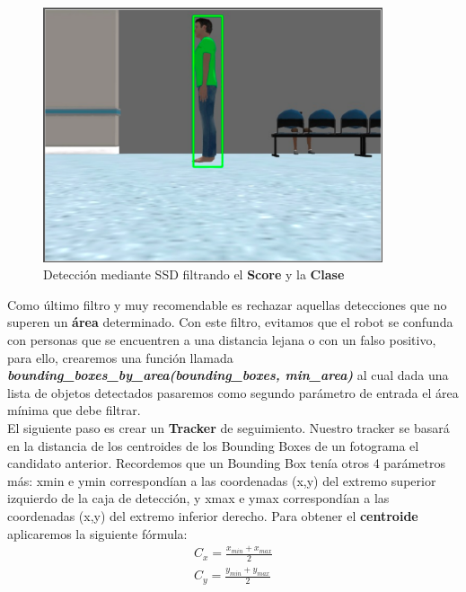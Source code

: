 \begin{figure} [H]
  \begin{center}
    \includegraphics[width=10cm]{imagenes/deteccion-ssd-filtro-score-class.png}
  \end{center}
  \caption[Detección mediante SSD filtrando el \textbf{Score} y la \textbf{Clase}]{Detección mediante SSD filtrando el \textbf{Score} y la \textbf{Clase}}
  \label{fig:deteccion_ssd_filtro_score_class}
\end{figure}

Como último filtro y muy recomendable es rechazar aquellas detecciones que no superen un \textbf{área} determinado. Con este filtro, evitamos que el robot se confunda con personas que se encuentren a una distancia lejana o con un falso positivo, para ello, crearemos una función llamada \textbf{\textit{bounding\_boxes\_by\_area(bounding\_boxes, min\_area)}} al cual dada una lista de objetos detectados pasaremos como segundo parámetro de entrada el área mínima que debe filtrar.\\

El siguiente paso es crear un \textbf{Tracker} de seguimiento. Nuestro tracker se basará en la distancia de los centroides de los Bounding Boxes de un fotograma el candidato anterior. Recordemos que un Bounding Box tenía otros 4 parámetros más: xmin e ymin correspondían a las coordenadas (x,y) del extremo superior izquierdo de la caja de detección, y xmax e ymax correspondían a las coordenadas (x,y) del extremo inferior derecho. Para obtener el \textbf{centroide} aplicaremos la siguiente fórmula:\\
\begin{eqnarray*}
C_x = \frac{x_{min} + x_{max}}{2}\\
C_y = \frac{y_{min} + y_{max}}{2}\\
\end{eqnarray*}


